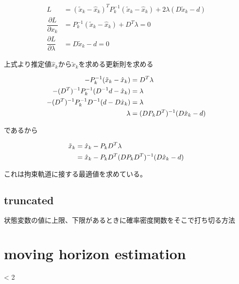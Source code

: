 \begin{align}
L
&=
(\tilde{x}_k-\hat{x}_k)^T P_k^{-1} (\tilde{x}_k-\hat{x}_k)
+2\lambda(D\tilde{x}_k-d)												\\
%
\dfrac{\partial L}{\partial x_k}  
&=
P_k^{-1}(\tilde{x}_k-\hat{x}_k)+D^T\lambda = 0					\\
%
\dfrac{\partial L}{\partial \lambda}
&=
D\tilde{x}_k-d = 0
\end{align}

上式より推定値$\hat{x}_k$から$\tilde{x}_k$を求める更新則を求める

\begin{align}
-P_k^{-1}(\tilde{x}_k-\hat{x}_k) &= D^T\lambda  					\notag\\
-(D^T)^{-1}P_k^{-1}(D^{-1}d-\hat{x}_k) &= \lambda			\notag\\
-(D^T)^{-1}P_k^{-1}D^{-1}(d-D\hat{x}_k) &= \lambda		\notag\\
\lambda &=  (DP_k D^T)^{-1}(D\hat{x}_k-d)
\end{align}

であるから

\begin{align}
\tilde{x}_k
&=
\hat{x}_k - P_k D^T \lambda 			\notag\\
&=
\hat{x}_k - P_k D^T (DP_k D^T)^{-1}(D\hat{x}_k-d)
\end{align}

これは拘束軌道に接する最適値を求めている。

\subsection{truncated}
状態変数の値に上限、下限があるときに確率密度関数をそこで打ち切る方法


\section{moving horizon estimation}












\ifnum {} < 2

\fi